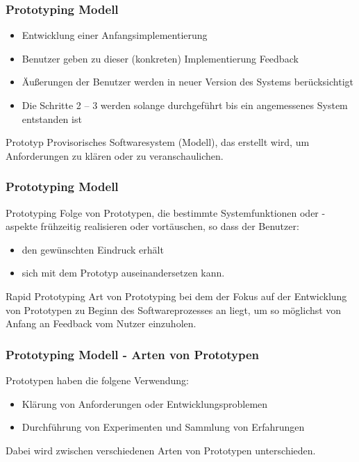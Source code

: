 \begin{frame}
\frametitle{Prototyping Modell}
	\begin{itemize}
		\item Entwicklung einer Anfangsimplementierung
		\item Benutzer geben zu dieser (konkreten) Implementierung Feedback
		\item Äußerungen der Benutzer werden in neuer Version des Systems berücksichtigt
		\item Die Schritte 2 – 3 werden solange durchgeführt bis ein angemessenes System entstanden ist
	\end{itemize}
	\begin{block}{Prototyp}
		Provisorisches Softwaresystem (Modell), das erstellt wird,
		um Anforderungen zu klären oder zu veranschaulichen.
	\end{block}
\end{frame}

\begin{frame}
\frametitle{Prototyping Modell}
	\begin{block}{Prototyping}
		Folge von Prototypen, die bestimmte Systemfunktionen oder -aspekte
		frühzeitig realisieren oder vortäuschen, so dass der Benutzer:
		\begin{itemize}
			\item den gewünschten Eindruck erhält
			\item sich mit dem Prototyp auseinandersetzen kann.
		\end{itemize}
	\end{block}
	\begin{block}{Rapid Prototyping}
		Art von Prototyping bei dem der Fokus auf der Entwicklung
		von Prototypen zu Beginn des Softwareprozesses an liegt,
		um so möglichst von Anfang an Feedback vom Nutzer einzuholen.
	\end{block}
\end{frame}

\begin{frame}
\frametitle{Prototyping Modell - Arten von Prototypen}
	Prototypen haben die folgene Verwendung:
	\begin{itemize}
		\item Klärung von Anforderungen oder Entwicklungsproblemen
		\item Durchführung von Experimenten und Sammlung von Erfahrungen
	\end{itemize}
	\bigskip
	Dabei wird zwischen verschiedenen Arten von Prototypen unterschieden.
\end{frame}

